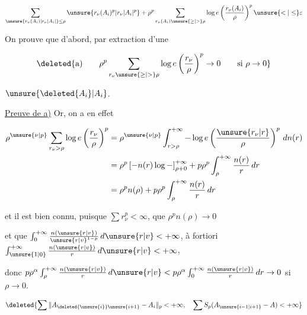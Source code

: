 \[
\sum_{\unsure{r_\nu(A_i)|r_\nu\lvert A_i\rvert}\leq\rho}\unsure{r_\nu(A_i)^p|r_\nu\lvert A_i\rvert^p}
+\rho^p\sum_{r_\nu(A_i)\unsure{\geq|>}\rho}\log e\left(\frac{r_\nu(A_i)}{\rho}\right)^p\unsure{<|\leq}\varepsilon
\]

On prouve que d'abord, par extraction d'une 


\[
\deleted{\text{a)}\qquad\rho^p\sum_{r_\nu\unsure{\geq|>}\rho}\log e\left(\frac{r_\nu}{\rho}\right)^p\to0\qquad\text{si }\rho\to0}
\]

 $\unsure{\deleted{A_i}|A_i}$.


\uline{Preuve de a)} Or, on a en effet


\[
\begin{aligned}
\rho^{\unsure{\nu|p}}\sum_{r_\nu>\rho}\log e\left(\frac{r_\nu}{\rho}\right)^p
&=\rho^{\unsure{\nu|p}}\int_{r>\rho}^{+\infty}-\log e\left(\frac{\unsure{r_\nu|r}}{\rho}\right)^p\,dn(r)\\
&=\rho^p\left[-n(r)\log-\right]_{\rho+0}^{+\infty}
+p\rho^p\int_\rho^{+\infty}\frac{n(r)}{r}\,dr\\
&=\rho^p n(\rho)+p\rho^p\int_\rho^{+\infty}\frac{n(r)}{r}\,dr
\end{aligned}
\]

et il est bien connu, puisque $\sum r_\nu^p<\infty$, que $\rho^p n(\rho)\to0$

et que $\int_0^{+\infty}\frac{n(\unsure{r|v})}{\unsure{r|v}^{1-p}}\,d\unsure{r|v}<+\infty$, à fortiori $\int_{\unsure{1|0}}^{+\infty}\frac{n(\unsure{r|v})}{r}\,d\unsure{r|v}<+\infty$,

donc $p\rho^\alpha\int_\rho^{+\infty}\frac{n(\unsure{r|v})}{r}\,d\unsure{r|v}<p\rho^\alpha\int_0^{+\infty}\frac{n(\unsure{r|v})}{r}\,dr\to0$ si $\rho\to0$.

\par\noindent\unsure{\rule{0.95\linewidth}{0.2pt}}\par


\[
\deleted{\sum\|A_{\deleted{\unsure{i}}\unsure{i+1}}-A_i\|_p<+\infty,\quad
\sum S_p(A_{\unsure{i-1|i+1}}-A)<+\infty}
\]


